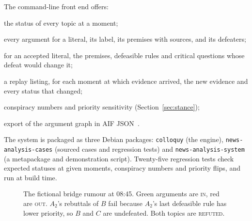 \documentclass[11pt]{article}
\newcommand{\cmd}[1]{\texttt{#1}}
\begin{document}
The command-line front end offers:
\begin{description}[nosep,font=\ttfamily\normalsize]
\item[status] the status of every topic at a moment;
\item[explain] every argument for a literal, its label, its premises with
  sources, and its defeaters;
\item[whatif] for an accepted literal, the premises, defeasible rules and
  critical questions whose defeat would change it;
\item[timeline] a replay listing, for each moment at which evidence
  arrived, the new evidence and every status that changed;
\item[robustness] conspiracy numbers and priority sensitivity
  (Section~\ref{sec:stance});
\item[aif] export of the argument graph in AIF JSON~\cite{aif}.
\end{description}

The system is packaged as three Debian packages: \cmd{colloquy} (the
engine), \cmd{news-analysis-cases} (sourced cases and regression tests)
and \cmd{news-analysis-system} (a metapackage and demonstration script).
Twenty-five regression tests check expected statuses at given moments,
conspiracy numbers and priority flips, and run at build time.

\begin{figure}[t]
\centering
{}
\caption{The fictional bridge rumour at 08:45. Green arguments are
\textsc{in}, red are \textsc{out}. $A_2$'s rebuttals of $B$ fail because
$A_2$'s last defeasible rule has lower priority, so $B$ and $C$ are
undefeated. Both topics are \textsc{refuted}.}
\label{fig:bridge}
\end{figure}
\end{document}
